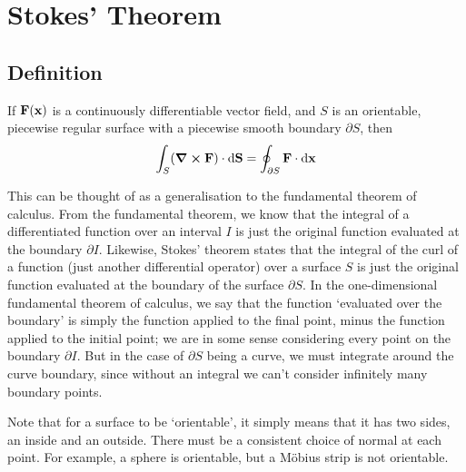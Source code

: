 \documentclass{article}
\begin{document}
\section{Stokes' Theorem}
\subsection{Definition}
\begin{proposition}
	If $\vb F(\vb x)$ is a continuously differentiable vector field, and $S$ is an orientable, piecewise regular surface with a piecewise smooth boundary $\partial S$, then
	\[ \int_S (\curl{\vb F}) \cdot \dd \vb S = \oint_{\partial S} \vb F\cdot \dd{\vb x} \]
\end{proposition}
\noindent This can be thought of as a generalisation to the fundamental theorem of calculus. From the fundamental theorem, we know that the integral of a differentiated function over an interval $I$ is just the original function evaluated at the boundary $\partial I$. Likewise, Stokes' theorem states that the integral of the curl of a function (just another differential operator) over a surface $S$ is just the original function evaluated at the boundary of the surface $\partial S$. In the one-dimensional fundamental theorem of calculus, we say that the function `evaluated over the boundary' is simply the function applied to the final point, minus the function applied to the initial point; we are in some sense considering every point on the boundary $\partial I$. But in the case of $\partial S$ being a curve, we must integrate around the curve boundary, since without an integral we can't consider infinitely many boundary points.

Note that for a surface to be `orientable', it simply means that it has two sides, an inside and an outside. There must be a consistent choice of normal at each point. For example, a sphere is orientable, but a M\"obius strip is not orientable.
\end{document}
